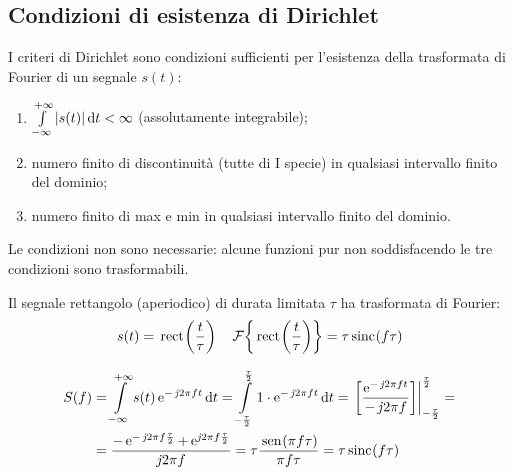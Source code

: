 \subsection{Condizioni di esistenza di Dirichlet}
I criteri di Dirichlet sono condizioni sufficienti per l'esistenza della trasformata di Fourier di un segnale $s(t)$:
\begin{enumerate}
	\item $\int\limits_{-\infty}^{+\infty}{\left|{s(t)}\right|}{\,\mathop{}\!\mathrm{d}{t}}<\infty$ (assolutamente integrabile);
	\item numero finito di discontinuità (tutte di I specie) in qualsiasi intervallo finito del dominio;
	\item numero finito di max e min in qualsiasi intervallo finito del dominio.
\end{enumerate}
\begin{nota}
	Le condizioni non sono necessarie: alcune funzioni pur non soddisfacendo le tre condizioni sono trasformabili.
\end{nota}
\begin{esempio}
Il segnale rettangolo (aperiodico) di durata limitata $\tau$ ha trasformata di Fourier:
\[
	s(t)=\,{\operatorname{rect}}^{}\!\left({\frac{t}{\tau}}\right)\quad\operatorname{\mathcal{F}}\!\left\lbrace{\,{\operatorname{rect}}^{}\!\left({\frac{t}{\tau}}\right)}\right\rbrace=\tau\,{\operatorname{sinc}}^{}\!\left({f\tau}\right)
\]

\begin{figure}[ht]
	\centering
	\qquad
\end{figure}

\begin{align*}
	S(f)&=\intinf{s(t)\e{-\imath 2\pi f t}}{t}
		 =\intd{-\frac{\tau}{2}}{\frac{\tau}{2}}{1\cdot\e{-\imath 2\pi f t}}{t}
		 =\bound{-\frac{\tau}{2}}{\frac{\tau}{2}}{\frac{\e{-\imath 2\pi f t}}{-\imath 2\pi f}}=\\
		&=\frac{-\e{-\imath 2\pi f\frac{\tau}{2}}+\e{\imath 2\pi f\frac{\tau}{2}}}{\imath 2\pi f}
		 =\tau\frac{\sen{\pi f\tau}}{\pi f\tau}
		 =\tau\sinc{f\tau}
\end{align*}
\end{esempio}

